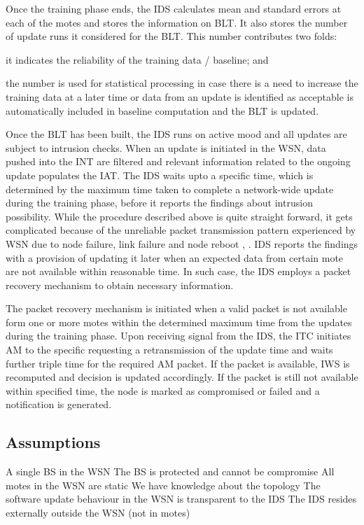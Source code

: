 \documentclass[conference,final]{IEEEtran}
\begin{document}
Once the training phase ends, the IDS calculates mean and standard errors at each of the motes and stores the  information on BLT.
It also stores the number of update runs it considered for the BLT.
This number contributes two folds:
\begin{inparaenum}
\item it indicates the reliability of the training data / baseline; and
\item the number is used for statistical processing in case there is a need to increase the training data at a later time or data from an update is identified as acceptable is automatically included in baseline computation and the BLT is updated.
\end{inparaenum}
Once the BLT has been built, the IDS runs on active mood and all updates are subject to intrusion checks.
When an update is initiated in the WSN, data pushed into the INT are filtered and relevant information related to the ongoing update populates the  IAT.
The IDS waits upto a specific time, which is determined by the maximum time taken to complete a network-wide  update during the training phase, before it reports the findings about intrusion possibility.
While the procedure described above is quite straight forward, it gets complicated because of the unreliable packet transmission pattern experienced by WSN due to node failure, link failure and node reboot \cite{aro04}, \cite{bec04}.
IDS reports the findings with a provision of updating it later when an expected data from certain mote are not available within reasonable time.
In such case, the IDS employs a packet recovery mechanism to obtain necessary information.

The packet recovery mechanism is initiated when a valid packet is not available form one or more motes within  the  determined maximum time from the updates  during the training phase.
Upon receiving signal from the IDS, the ITC initiates AM to the specific requesting a retransmission of the update time and waits further  triple time for the required AM packet. If the packet is available,  IWS is recomputed and decision is updated accordingly.
If the packet is still not available within specified time, the node is marked as compromised or failed and a notification is generated.


\subsection{Assumptions}
\label{sc:assump}
A single BS in the WSN
The BS is protected and cannot be compromise
All motes in the WSN are static
We have knowledge about the topology
The software update behaviour in the WSN is transparent to the IDS
The IDS resides externally outside the WSN (not in motes)
\end{document}
